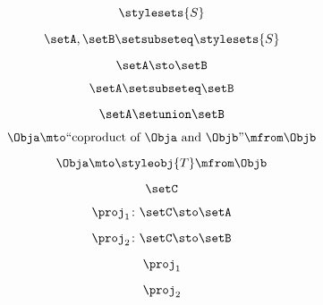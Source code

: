 \begin{forslides}
    \begin{equation}
        \label{eq:parallelism-144}
        \stylesets{S}
    \end{equation}

    \begin{equation}
        \label{eq:parallelism-145}
        \setA,\setB\setsubseteq \stylesets{S}
    \end{equation}

    \begin{equation}
        \label{eq:parallelism-146}
        \setA \sto \setB
    \end{equation}

    \begin{equation}
        \label{eq:parallelism-147}
        \setA\setsubseteq \setB
    \end{equation}

    \begin{equation}
        \label{eq:parallelism-148}
        \setA\setunion\setB
    \end{equation}

    \begin{equation}
        \label{eq:parallelism-149}
        \Obja \mto \text{``coproduct of } \Obja \text{ and } \Objb \text{''}  \mfrom \Objb
    \end{equation}

    \begin{equation}
        \label{eq:parallelism-150}
        \Obja \mto \styleobj{T} \mfrom \Objb
    \end{equation}

    \begin{equation}
        \label{eq:parallelism-151}
        \setC
    \end{equation}

    \begin{equation}
        \label{eq:parallelism-152}
        \proj_1\colon \setC \sto \setA
    \end{equation}

    \begin{equation}
        \label{eq:parallelism-153}
        \proj_2\colon \setC \sto \setB
    \end{equation}

    \begin{equation}
        \label{eq:parallelism-154}
        \proj_1
    \end{equation}

    \begin{equation}
        \label{eq:parallelism-155}
        \proj_2
    \end{equation}


\end{forslides}
